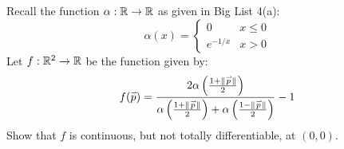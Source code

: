 \documentclass{article}
\begin{document}
\setcounter{subsection}{7}
\setcounter{qu}{6}

\begin{qu}
    Recall the function $ \alpha: \mathbb{R} \rightarrow \mathbb{R} $ as given in Big List 4(a):
    \begin{equation*}
    \alpha(x) = \begin{cases} 0 & x \leq 0 \\ e^{-1/x} & x > 0 \end{cases}
    \end{equation*}
    Let $ f: \mathbb{R}^{2} \rightarrow \mathbb{R} $ be the function given by:
    \begin{equation*}
        f(\vec p) = \frac{2\alpha\left(\frac{1+\norm{\vec p}}{2}\right)}
        {\alpha\left( \frac{1+\norm{\vec p}}{2}\right)
        + \alpha\left( \frac{1 - \norm{\vec p}}{2} \right)} - 1
    \end{equation*}
    Show that $ f $ is continuous, but not totally differentiable, at $ (0, 0) $.
\end{qu}
\end{document}
